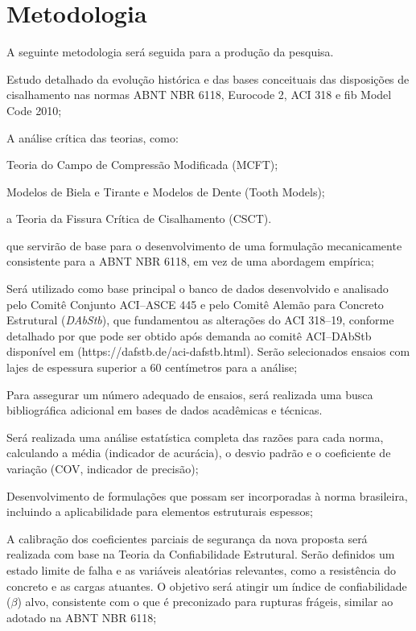 \chapter{Metodologia}
A seguinte metodologia será seguida para a produção da pesquisa.

\begin{alineas}
    \item Estudo detalhado da evolução histórica e das bases conceituais das disposições de cisalhamento nas normas ABNT NBR 6118, Eurocode 2, ACI 318 e fib Model Code 2010;
    \item A análise crítica das teorias, como:
    \begin{alineas}
        \item Teoria do Campo de Compressão Modificada (MCFT);
        \item Modelos de Biela e Tirante e Modelos de Dente (Tooth Models);
        \item a Teoria da Fissura Crítica de Cisalhamento (CSCT).
    \end{alineas}\noindent que servirão de base para o desenvolvimento de uma formulação mecanicamente consistente para a ABNT NBR 6118, em vez de uma abordagem empírica;
    \item Será utilizado como base principal o banco de dados desenvolvido e analisado pelo Comitê Conjunto ACI--ASCE 445 e pelo Comitê Alemão para Concreto Estrutural (\textit{DAbStb}), que fundamentou as alterações do ACI 318--19, conforme detalhado por \textcite{Kuchma2019} que pode ser obtido após demanda ao comitê ACI--DAbStb disponível em (https://dafstb.de/aci-dafstb.html). Serão selecionados ensaios com lajes de espessura superior a 60 centímetros para a análise;
    \item Para assegurar um número adequado de ensaios, será realizada uma busca bibliográfica adicional em bases de dados acadêmicas e técnicas.
    \item Será realizada uma análise estatística completa das razões para cada norma, calculando a média (indicador de acurácia), o desvio padrão e o coeficiente de variação (COV, indicador de precisão);
    \item Desenvolvimento de formulações que possam ser incorporadas à norma brasileira, incluindo a aplicabilidade para elementos estruturais espessos;
    \item A calibração dos coeficientes parciais de segurança da nova proposta será realizada com base na Teoria da Confiabilidade Estrutural. Serão definidos um estado limite de falha e as variáveis aleatórias relevantes, como a resistência do concreto e as cargas atuantes. O objetivo será atingir um índice de confiabilidade ($\beta$) alvo, consistente com o que é preconizado para rupturas frágeis, similar ao adotado na ABNT NBR 6118;

\end{alineas}
